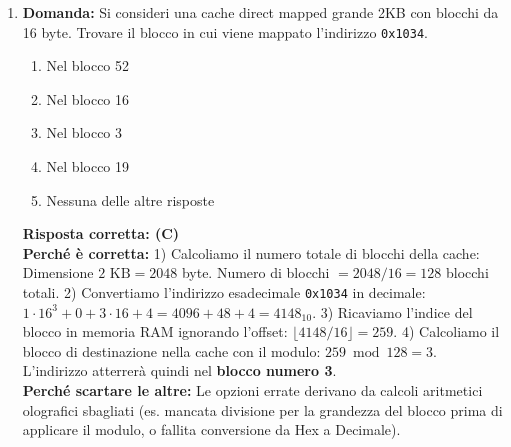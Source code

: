 \documentclass[12pt, a4paper]{article}
\begin{document}
\begin{enumerate}
    \item \textbf{Domanda:} Si consideri una cache direct mapped grande 2KB con blocchi da 16 byte. Trovare il blocco in cui viene mappato l'indirizzo \texttt{0x1034}.
    \begin{enumerate}[label=(\Alph*)]
        \item Nel blocco 52
        \item Nel blocco 16
        \item Nel blocco 3
        \item Nel blocco 19
        \item Nessuna delle altre risposte
    \end{enumerate}
    \textbf{Risposta corretta: (C)} \\
    \textbf{Perché è corretta:} 1) Calcoliamo il numero totale di blocchi della cache: Dimensione $2\text{ KB} = 2048$ byte. Numero di blocchi $= 2048 / 16 = 128$ blocchi totali. 2) Convertiamo l'indirizzo esadecimale \texttt{0x1034} in decimale: $1 \cdot 16^3 + 0 + 3 \cdot 16 + 4 = 4096 + 48 + 4 = 4148_{10}$. 3) Ricaviamo l'indice del blocco in memoria RAM ignorando l'offset: $\lfloor 4148 / 16 \rfloor = 259$. 4) Calcoliamo il blocco di destinazione nella cache con il modulo: $259 \bmod 128 = 3$. L'indirizzo atterrerà quindi nel \textbf{blocco numero 3}. \\
    \textbf{Perché scartare le altre:} Le opzioni errate derivano da calcoli aritmetici olografici sbagliati (es. mancata divisione per la grandezza del blocco prima di applicare il modulo, o fallita conversione da Hex a Decimale).

\newpage


\end{enumerate}
\end{document}
